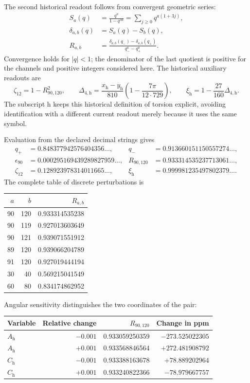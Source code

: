 The second historical readout follows from convergent geometric series:
\begin{align*}
 S_a(q)&=\frac{q^a}{1-q^{3a}}=\sum_{j\geq0}q^{a(1+3j)},\\
 \delta_{a,b}(q)&=S_a(q)-S_b(q),\\
 R_{a,b}&=\frac{\delta_{a,b}(q_-)-\delta_{a,b}(q_+)}{q_-^a-q_+^a}.
\end{align*}
Convergence holds for $|q|<1$; the denominator of the last quotient is
positive for the channels and positive integers considered here. The
historical auxiliary readouts are
\[
 \zeta_{12}=1-R_{90,120}^2,\qquad
 \Delta_{4,\mathrm h}=\frac{x_{\mathrm h}-y_{\mathrm h}}{810}
 \left(1-\frac{7\pi}{12\cdot729}\right),\qquad
 \xi_{\mathrm h}=1-\frac{27}{160}\Delta_{4,\mathrm h}.
\]
The subscript $\mathrm h$ keeps this historical definition of torsion
explicit, avoiding identification with a different current readout merely
because it uses the same symbol.

Evaluation from the declared decimal strings gives
\begin{align*}
 q_+&=0.848377942576404356\ldots,&
 q_-&=0.913660151150557274\ldots,\\
 \epsilon_{90}&=0.000295169439289827959\ldots,&
 R_{90,120}&=0.933314535237713061\ldots,\\
 \zeta_{12}&=0.128923978314011665\ldots,&
 \xi_{\mathrm h}&=0.999981235497802379\ldots.
\end{align*}
The complete table of discrete perturbations is
\begin{center}
\begin{tabular}{rrr}
\toprule
$a$&$b$&$R_{a,b}$\\\midrule
90&120&0.933314535238\\
90&119&0.927013603649\\
90&121&0.939071551912\\
89&120&0.939066204789\\
91&120&0.927019444194\\
30&40&0.569215041549\\
60&80&0.834174862952\\
\bottomrule
\end{tabular}
\end{center}
Angular sensitivity distinguishes the two coordinates of the pair:
\begin{center}
\begin{tabular}{lrrr}
\toprule
Variable&Relative change&$R_{90,120}$&Change in ppm\\\midrule
$A_{\mathrm h}$&$-0.001$&0.933059250359&$-273.525022305$\\
$A_{\mathrm h}$&$+0.001$&0.933568846564&$+272.481908792$\\
$C_{\mathrm h}$&$-0.001$&0.933388163678&$+78.889202964$\\
$C_{\mathrm h}$&$+0.001$&0.933240822366&$-78.979667757$\\
\bottomrule
\end{tabular}
\end{center}

